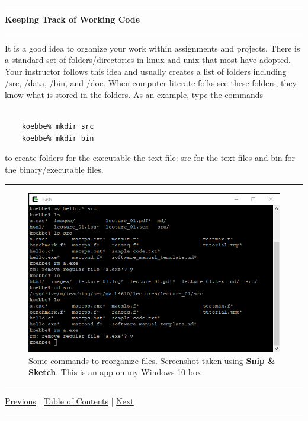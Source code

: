 \documentclass[10pt,fleqn]{article}
\begin{document}
\eject
\vskip0.1in\hrule\vskip0.1in
\noindent
{\large{\bf Keeping Track of Working Code}}
\vskip0.1in\hrule\vskip0.1in
\noindent
It is a good idea to organize your work within assignments and projects. There
is a standard set of folders/directories in linux and unix that most have
adopted. Your instructor follows this idea and usually creates a list of
folders including /src, /data, /bin, and /doc. When computer literate folks see
these folders, they know what is stored in the folders. As an example, type the
commands
\begin{verbatim}

    koebbe% mkdir src
    koebbe% mkdir bin

\end{verbatim}
to create folders for the executable the text file: src for the text files and
bin for the binary/executable files. 
\vskip0.1in\hrule\vskip0.1in
\vfill
\begin{figure}[h]
\centering
\includegraphics{../images/cygwin_09.png}
\caption{Some commands to reorganize files. Screenshot taken using
         {\bf Snip \& Sketch}. This is an app on my Windows 10 box}
\end{figure}
\vskip0.1in\hrule\vskip0.1in \noindent
  \href{../../topic_04/md/topic_04.md}{Previous} |
  \href{../../toc/md/topic_toc.md}{Table of Contents} |
  \href{../../topic_06/md/topic_06.md}{Next}
\vskip0.1in\hrule\vskip0.1in \noindent
\end{document}
